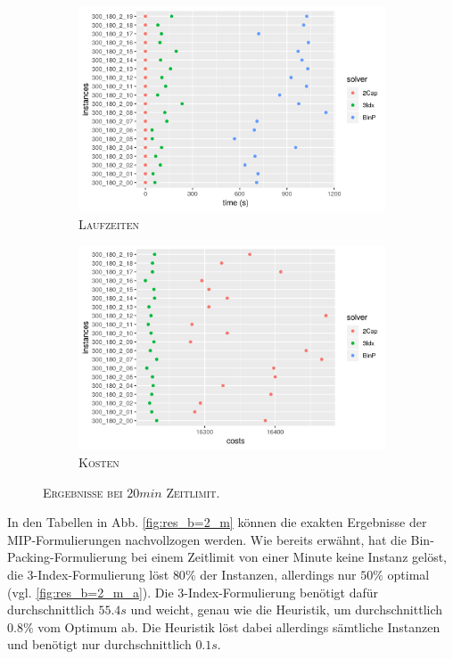 \begin{figure}[H]
\centering
\begin{subfigure}[b]{0.4\textwidth}
\centering
\includegraphics[width=1.3\textwidth]{img/solver_instance_time_b=2_m_1200s.png}
\caption{\textsc{Laufzeiten}}
\label{fig:b=2_m_runtimes}
\end{subfigure}
\hfill
\begin{subfigure}[b]{0.4\textwidth}
\centering
\includegraphics[width=1.3\textwidth]{img/solver_instance_cost_b=2_m_1200s.png}
\caption{\textsc{Kosten}}
\label{fig:b=2_m_costs}
\end{subfigure}
\caption{\textsc{Ergebnisse bei $20min$ Zeitlimit}.}
\label{fig:res_plots_b=2_m}
\end{figure}

In den Tabellen in Abb. \ref{fig:res_b=2_m} können die exakten Ergebnisse der MIP-Formulierungen nachvollzogen werden.
Wie bereits erwähnt, hat die Bin-Packing-Formulierung bei einem Zeitlimit von einer Minute keine Instanz gelöst, die 3-Index-Formulierung löst
$80 \%$ der Instanzen, allerdings nur $50 \%$ optimal (vgl. \ref{fig:res_b=2_m_a}). Die 3-Index-Formulierung benötigt dafür durchschnittlich
$55.4s$ und weicht, genau wie die Heuristik, um durchschnittlich $0.8 \%$ vom Optimum ab. Die Heuristik löst dabei allerdings sämtliche Instanzen
und benötigt nur durchschnittlich $0.1s$.


